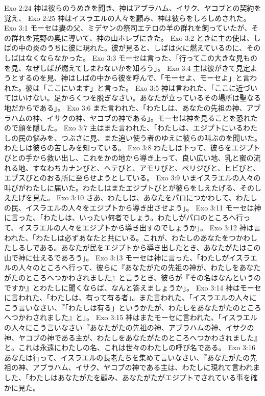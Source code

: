Exo 2:24  神は彼らのうめきを聞き、神はアブラハム、イサク、ヤコブとの契約を覚え、
Exo 2:25  神はイスラエルの人々を顧み、神は彼らをしろしめされた。
Exo 3:1  モーセは妻の父、ミデヤンの祭司エテロの羊の群れを飼っていたが、その群れを荒野の奥に導いて、神の山ホレブにきた。
Exo 3:2  ときに主の使は、しばの中の炎のうちに彼に現れた。彼が見ると、しばは火に燃えているのに、そのしばはなくならなかった。
Exo 3:3  モーセは言った、「行ってこの大きな見ものを見、なぜしばが燃えてしまわないかを知ろう」。
Exo 3:4  主は彼がきて見定ようとするのを見、神はしばの中から彼を呼んで、「モーセよ、モーセよ」と言われた。彼は「ここにいます」と言った。
Exo 3:5  神は言われた、「ここに近づいてはいけない。足からくつを脱ぎなさい。あなたが立っているその場所は聖なる地だからである」。
Exo 3:6  また言われた、「わたしは、あなたの先祖の神、アブラハムの神、イサクの神、ヤコブの神である」。モーセは神を見ることを恐れたので顔を隠した。
Exo 3:7  主はまた言われた、「わたしは、エジプトにいるわたしの民の悩みを、つぶさに見、また追い使う者のゆえに彼らの叫ぶのを聞いた。わたしは彼らの苦しみを知っている。
Exo 3:8  わたしは下って、彼らをエジプトびとの手から救い出し、これをかの地から導き上って、良い広い地、乳と蜜の流れる地、すなわちカナンびと、ヘテびと、アモリびと、ペリジびと、ヒビびと、エブスびとのおる所に至らせようとしている。
Exo 3:9  いまイスラエルの人々の叫びがわたしに届いた。わたしはまたエジプトびとが彼らをしえたげる、そのしえたげを見た。
Exo 3:10  さあ、わたしは、あなたをパロにつかわして、わたしの民、イスラエルの人々をエジプトから導き出させよう」。
Exo 3:11  モーセは神に言った、「わたしは、いったい何者でしょう。わたしがパロのところへ行って、イスラエルの人々をエジプトから導き出すのでしょうか」。
Exo 3:12  神は言われた、「わたしは必ずあなたと共にいる。これが、わたしのあなたをつかわしたしるしである。あなたが民をエジプトから導き出したとき、あなたがたはこの山で神に仕えるであろう」。
Exo 3:13  モーセは神に言った、「わたしがイスラエルの人々のところへ行って、彼らに『あなたがたの先祖の神が、わたしをあなたがたのところへつかわされました』と言うとき、彼らが『その名はなんというのですか』とわたしに聞くならば、なんと答えましょうか」。
Exo 3:14  神はモーセに言われた、「わたしは、有って有る者」。また言われた、「イスラエルの人々にこう言いなさい、『「わたしは有る」というかたが、わたしをあなたがたのところへつかわされました』と」。
Exo 3:15  神はまたモーセに言われた、「イスラエルの人々にこう言いなさい『あなたがたの先祖の神、アブラハムの神、イサクの神、ヤコブの神である主が、わたしをあなたがたのところへつかわされました』と。これは永遠にわたしの名、これは世々のわたしの呼び名である。
Exo 3:16  あなたは行って、イスラエルの長老たちを集めて言いなさい、『あなたがたの先祖の神、アブラハム、イサク、ヤコブの神である主は、わたしに現れて言われました、「わたしはあなたがたを顧み、あなたがたがエジプトでされている事を確かに見た。
